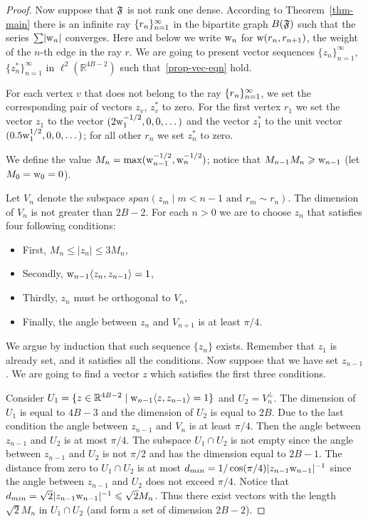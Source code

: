 \documentclass[12pt,oneside,a4paper]{amsart}
\begin{document}
\begin{proof}
        Now suppose that $\mathfrak{F}$ is not rank one dense.
        According to Theorem~\ref{thm-main} there is an infinite ray $\{{r}_n\}_{n=1}^\infty$ in the bipartite
          graph $B(\mathfrak{F})$ such that the series $\sum\lvert\mathrm{w}_n\rvert$ converges.
        Here and below we write $\mathrm{w}_n$ for $\mathrm{w}(r_n, r_{n + 1})$, the weight of the $n$-th edge in the ray $r$.
        We are going to present vector sequences $\{z_n\}_{n=1}^\infty$, $\{z^*_n\}_{n=1}^\infty$ in $\ell^2 (\mathbb{R}^{4B-2})$
          such that~\eqref{prop-vec-eqn} hold.

        For each vertex $v$ that does not belong to the ray $\{{r}_n\}_{n=1}^\infty$, we set the corresponding pair of vectors $z_v$, $z^*_v$ to zero.
        For the first vertex $r_1$ we set the vector $z_1$ to the vector $(2\mathrm{w}^{-1/2}_1, 0, 0, \dots)$ and
          the vector $z^*_1$ to the unit vector $(0.5\mathrm{w}^{1/2}_1, 0, 0, \dots)$;
          for all other $r_n$ we set $z^*_n$ to zero.

        We define the value $M_n = \max(\mathrm{w}_{n-1}^{-1/2}, \mathrm{w}_n^{-1/2})$; notice that $M_{n - 1} M_n \geqslant \mathrm{w}_{n - 1}$ (let $M_0 = \mathrm{w}_0 = 0$).

        Let $V_n$ denote the subspace $span(z_m  \mid m < n - 1 \text{ and } r_m \sim r_n)$.
        The dimension of $V_n$ is not greater than $2B - 2$.
        For each $n > 0$ we are to choose $z_n$ that satisfies four following conditions:
        \begin{itemize}
          \item First, $M_n \leq \lvert z_n \rvert \leq 3 M_n$,
          \item Secondly, $\mathrm{w}_{n-1}\langle z_n, z_{n - 1} \rangle = 1$,
          \item Thirdly, $z_n$ must be orthogonal to $V_n$,
          \item Finally, the angle between $z_n$ and $V_{n + 1}$ is at least $\pi/4$.
        \end{itemize}

        We argue by induction that such sequence $\{z_n\}$ exists.
        Remember that $z_1$ is already set, and it satisfies all the conditions.
        Now suppose that we have set $z_{n - 1}$.
        We are going to find a vector $z$ which satisfies the first three conditions.

        Consider $U_1 = \{z \in \mathbb{R}^{4B-2} \mid \mathrm{w}_{n-1} \langle z, z_{n-1} \rangle = 1\}$ and $U_2 = V_n^\bot$.
        The dimension of $U_1$ is equal to $4B - 3$ and the dimension of $U_2$ is equal to $2B$.
        Due to the last condition the angle between $z_{n - 1}$ and $V_n$ is at least $\pi / 4$.
        Then the angle between $z_{n-1}$ and $U_2$ is at most $\pi / 4$.
        The subspace $U_1 \cap U_2$ is not empty since the angle between $z_{n-1}$ and $U_2$ is not $\pi/2$ and
          has the dimension equal to $2B-1$.
        The distance from zero to $U_1 \cap U_2$ is at most $d_{min} = 1/\cos(\pi/4)\lvert z_{n-1} \mathrm{w}_{n-1}\rvert^{-1}$
          since the angle between $z_{n-1}$ and $U_2$ does not exceed $\pi/4$.
        Notice that $d_{min} = \sqrt{2} \lvert z_{n-1} \mathrm{w}_{n-1} \rvert^{-1} \leqslant \sqrt{2}M_n$.
        Thus there exist vectors with the length $\sqrt{2}M_n$ in $U_1 \cap U_2$ (and form a set of dimension $2B-2$).


\end{proof}
\end{document}
